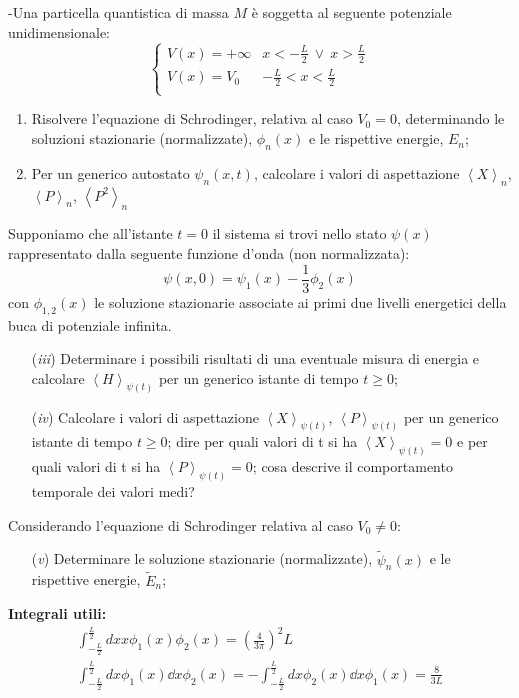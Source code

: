 \documentclass[12pt,twoside,a4]{article}
\begin{document}
\begin{esercizio}
-Una particella quantistica di massa $M$ è soggetta al seguente potenziale unidimensionale:
\begin{equation*}
	\begin{cases}
		V(x)=+\infty & x<-\frac{L}{2} \ \lor \ x>\frac{L}{2} \\
		V(x)=V_0 & -\frac{L}{2}<x<\frac{L}{2}\\
	\end{cases}
\end{equation*}
\begin{enumerate}[label=(\textit{\roman*})]
	\item Risolvere l'equazione di Schrodinger, relativa al caso $V_0=0$, determinando le soluzioni stazionarie (normalizzate), $\phi_n(x)$ e le rispettive energie, $E_n$;
	\item Per un generico autostato $\psi_n(x,t)$, calcolare i valori di aspettazione $\left< X\right>_n$, $\left< P\right>_n$, $\left< P^2\right>_n$
\end{enumerate}
Supponiamo che all'istante $t=0$ il sistema si trovi nello stato $\psi(x)$ rappresentato dalla seguente funzione d'onda (non normalizzata):
\begin{equation*}
	\psi(x,0)=\psi_1(x) - \frac{1}{3} \phi_2(x)
\end{equation*}
con $\phi_{1,2}(x)$ le soluzione stazionarie associate ai primi due livelli energetici della buca di potenziale infinita.
\begin{enumerate}[label=(\textit{\roman*})]
	\item[(\textit{iii})] Determinare i possibili risultati di una eventuale misura di energia e calcolare $\left< H \right>_{\psi(t)}$ per un generico istante di tempo $t \geq 0$;
	\item[(\textit{iv})] Calcolare i valori di aspettazione $\left< X \right>_{\psi(t)}$, $\left< P \right>_{\psi(t)}$ per un generico istante di tempo $t \geq 0$; dire per quali valori di t si ha $\left< X \right>_{\psi(t)}=0$ e per quali valori di t si ha $\left< P \right>_{\psi(t)}=0$; cosa descrive il comportamento temporale dei valori medi?
\end{enumerate}
Considerando l'equazione di Schrodinger relativa al caso $V_0 \neq 0$:
\begin{enumerate}[label=(\textit{\roman*})]
	\item[(\textit{v})] Determinare le soluzione stazionarie (normalizzate), $\tilde \psi_n(x)$ e le rispettive energie, $\tilde E_n$;
\end{enumerate}
\textbf{Integrali utili:}
\begin{gather}
	\int_{-\frac{L}{2}}^{\frac{L}{2}}dx x \phi_1(x) \phi_2(x)= \left( \frac{4}{3 \pi} \right)^2L\\
	\int_{-\frac{L}{2}}^{\frac{L}{2}}dx \phi_1(x) \dd{}{x}\phi_2(x)= -\int_{-\frac{L}{2}}^{\frac{L}{2}}dx \phi_2(x) \dd{}{x}\phi_1(x)= \frac{8}{3L}\end{gather}
\end{esercizio}
\end{document}
